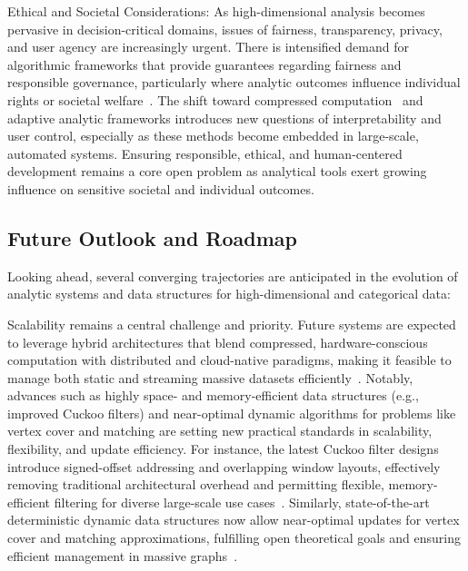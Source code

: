 \documentclass[sigconf]{acmart}
\begin{document}
Ethical and Societal Considerations: As high-dimensional analysis becomes pervasive in decision-critical domains, issues of fairness, transparency, privacy, and user agency are increasingly urgent. There is intensified demand for algorithmic frameworks that provide guarantees regarding fairness and responsible governance, particularly where analytic outcomes influence individual rights or societal welfare~\cite{ref117,ref118}. The shift toward compressed computation~\cite{ref118} and adaptive analytic frameworks introduces new questions of interpretability and user control, especially as these methods become embedded in large-scale, automated systems. Ensuring responsible, ethical, and human-centered development remains a core open problem as analytical tools exert growing influence on sensitive societal and individual outcomes.

\subsection{Future Outlook and Roadmap}

Looking ahead, several converging trajectories are anticipated in the evolution of analytic systems and data structures for high-dimensional and categorical data:

Scalability remains a central challenge and priority. Future systems are expected to leverage hybrid architectures that blend compressed, hardware-conscious computation with distributed and cloud-native paradigms, making it feasible to manage both static and streaming massive datasets efficiently~\cite{ref84,ref87}. Notably, advances such as highly space- and memory-efficient data structures (e.g., improved Cuckoo filters) and near-optimal dynamic algorithms for problems like vertex cover and matching are setting new practical standards in scalability, flexibility, and update efficiency. For instance, the latest Cuckoo filter designs introduce signed-offset addressing and overlapping window layouts, effectively removing traditional architectural overhead and permitting flexible, memory-efficient filtering for diverse large-scale use cases~\cite{ref87}. Similarly, state-of-the-art deterministic dynamic data structures now allow near-optimal updates for vertex cover and matching approximations, fulfilling open theoretical goals and ensuring efficient management in massive graphs~\cite{ref84}.
\end{document}
